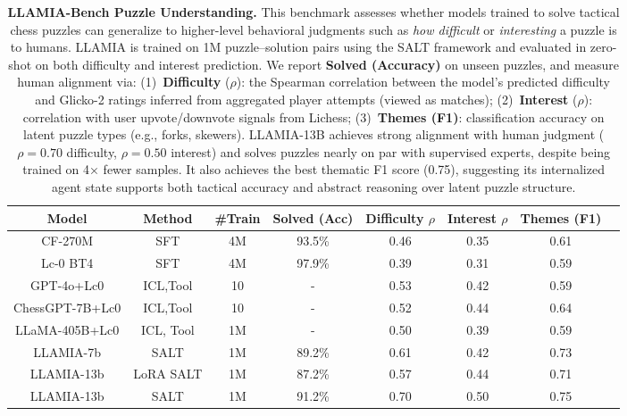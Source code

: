 \documentclass{article}
\newcommand{\valbest}[1]{\colorbox{valbest}{#1}}
\newcommand{\valgood}[1]{\colorbox{valgood}{#1}}
\theoremstyle{plain}
\theoremstyle{definition}
\theoremstyle{remark}
\begin{document}
\begin{table}[]
    \centering
    \begin{adjustbox}{max width=0.95\textwidth}
    \centering
    \begin{tabular}{cc|cccccc}
    \toprule[1.2pt]
        \textbf{Model} & \textbf{Method} & \textbf{\#Train} & \textbf{Solved (Acc)} & \textbf{Difficulty $\rho$} & \textbf{Interest $\rho$} & \textbf{Themes (F1)}\\\midrule
        CF-270M & SFT &  4M & \valbest{93.5\%} & 0.46 & 0.35 & 0.61\\
        Lc-0 BT4 & SFT & 4M & \valgood{97.9\%} & 0.39 & 0.31 & 0.59 \\\midrule
        GPT-4o+Lc0 & ICL,Tool & 10 & - & 0.53 & 0.42 & 0.59 \\
        ChessGPT-7B+Lc0 & ICL,Tool & 10 & - & 0.52 & 0.44 & 0.64 \\
        LLaMA-405B+Lc0 & ICL, Tool & 1M & - & 0.50 & 0.39 & 0.59 \\\midrule
        LLAMIA-7b & SALT&1M &89.2\% & \valgood{0.61} & 0.42 & \valgood{0.73}\\
        LLAMIA-13b & LoRA SALT &1M &87.2\%  & 0.57 & \valgood{0.44} & 0.71\\
        LLAMIA-13b & SALT &1M &91.2\%  & \valbest{0.70} & \valbest{0.50} & \valbest{0.75}\\
    \bottomrule[1.2pt]
    \end{tabular}
    \end{adjustbox}
    \caption{
\textbf{LLAMIA-Bench Puzzle Understanding.}  This benchmark assesses whether models trained to solve tactical chess puzzles can generalize to higher-level behavioral judgments such as \emph{how difficult} or \emph{interesting} a puzzle is to humans. LLAMIA is trained on 1M puzzle–solution pairs using the SALT framework and evaluated in zero-shot on both difficulty and interest prediction. We report \textbf{Solved (Accuracy)} on unseen puzzles, and measure human alignment via:  (1)~\textbf{Difficulty} ($\rho$): the Spearman correlation between the model’s predicted difficulty and Glicko-2 ratings inferred from aggregated player attempts (viewed as matches);  (2)~\textbf{Interest} ($\rho$): correlation with user upvote/downvote signals from Lichess;   (3)~\textbf{Themes (F1)}: classification accuracy on latent puzzle types (e.g., forks, skewers). LLAMIA-13B achieves strong alignment with human judgment (\(\rho = 0.70\) difficulty, \(\rho = 0.50\) interest) and solves puzzles nearly on par with supervised experts, despite being trained on 4× fewer samples. It also achieves the best thematic F1 score (0.75), suggesting its internalized agent state supports both tactical accuracy and abstract reasoning over latent puzzle structure.
}

    \label{tab:puzzle_understanding}
    \end{table}
\end{document}
